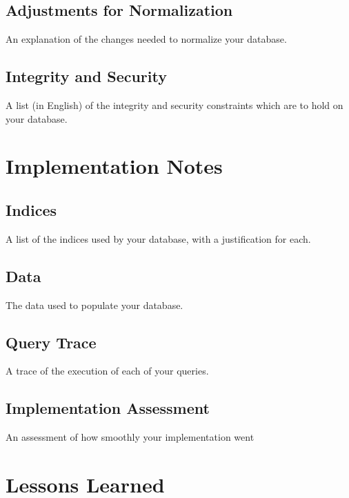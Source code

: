 \documentclass[11pt, a4paper]{report}
\begin{document}
\section{Adjustments for Normalization}
    An explanation of the changes needed to normalize your database.
\section{Integrity and Security}
    A list (in English) of the integrity and security constraints which are to hold on your database.

\chapter{Implementation Notes}
\section{Indices}
    A list of the indices used by your database, with a justification for each.
\section{Data}
    The data used to populate your database.
\section{Query Trace}
    A trace of the execution of each of your queries.
\section{Implementation Assessment}
    An assessment of how smoothly your implementation went

\chapter{Lessons Learned}
\end{document}
